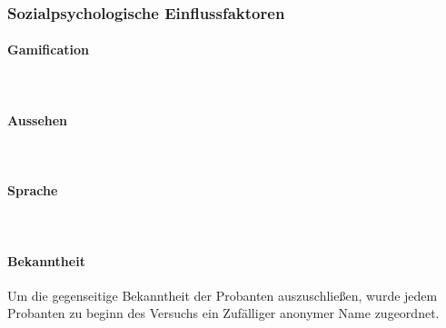 \documentclass[a4paper,11pt]{article}%
\renewcommand{\\}{\vspace*{0.5\baselineskip} \newline}
\begin{document}
			\subsubsection{Sozialpsychologische Einflussfaktoren}
				\paragraph{Gamification} $~$ \\
				\paragraph{Aussehen} $~$ \\
				\paragraph{Sprache} $~$ \\	
				\paragraph{Bekanntheit}
Um die gegenseitige Bekanntheit der Probanten auszuschließen, wurde jedem Probanten zu beginn des Versuchs ein Zufälliger anonymer Name zugeordnet.
			
\end{document}
